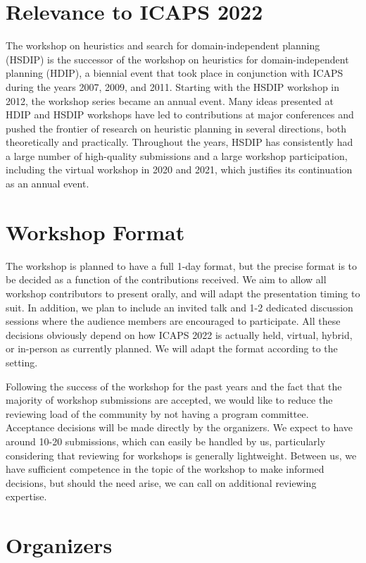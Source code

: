 \documentclass[10pt]{article}
\begin{document}
\section*{Relevance to ICAPS 2022}

The workshop on heuristics and search for domain-independent planning (HSDIP) is
the successor of the workshop on heuristics for domain-independent planning
(HDIP), a biennial event that took place in conjunction with ICAPS during the
years 2007, 2009, and 2011. Starting with the HSDIP workshop in 2012, the
workshop series became an annual event.
Many ideas presented at HDIP and HSDIP workshops have led to contributions at major
conferences and pushed the frontier of research on heuristic planning in several
directions, both theoretically and practically. Throughout the years, HSDIP has
consistently had a large number of high-quality submissions and a large workshop
participation, including the virtual workshop in 2020 and 2021, which justifies its
continuation as an annual event.

\section*{Workshop Format}

The workshop is planned to have a full 1-day format, but the precise format is
to be decided as a function of the contributions received.  We aim to allow all
workshop contributors to present orally, and will adapt the presentation timing
to suit. In addition, we plan to include an invited talk and 1-2 dedicated
discussion sessions where the audience members are encouraged to participate.
All these decisions obviously depend on how ICAPS 2022 is actually held,
virtual, hybrid, or in-person as currently planned. We will adapt the format
according to the setting.

Following the success of the workshop for the past years and the fact
that the majority of workshop submissions are accepted, we would like to reduce
the reviewing load of the community by not having a program
committee. Acceptance decisions will be made directly by the
organizers. We expect to have around 10-20 submissions, which can
easily be handled by us, particularly considering that reviewing for
workshops is generally lightweight. Between us, we have sufficient
competence in the topic of the workshop to make informed decisions,
but should the need arise, we can call on additional reviewing
expertise.

\section*{Organizers}
\end{document}
